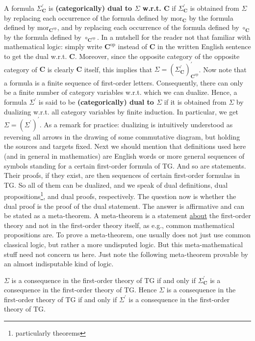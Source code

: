 A formula $\Sigma_{\mathbf{C}}^{\prime}$ is \textbf{(categorically) dual to $\Sigma$ w.r.t. $\mathbf{C}$} if $\Sigma_{\mathbf{C}}^{\prime}$ is obtained from $\Sigma$ by replacing each occurrence of the formula defined by $\mathrm{mor}_{\mathbf{C}}$ by the formula defined by $\mathrm{mor}_{\mathbf{C}^{\mathrm{op}}}$, and by replacing each occurrence of the formula defined by $\circ_{\mathbf{C}}$ by the formula defined by $\circ_{\mathbf{C}^{\mathrm{op}}}$.
In a nutshell for the reader not that familiar with mathematical logic: simply write $\mathbf{C}^{\mathrm{op}}$ instead of $\mathbf{C}$ in the written English sentence to get the dual w.r.t. $\mathbf{C}$.
Moreover, since the opposite category of the opposite category of $\mathbf{C}$ is clearly $\mathbf{C}$ itself, this implies that $\Sigma = (\Sigma_{\mathbf{C}}^{\prime})_{\mathbf{C}^{\mathrm{op}}}^{\prime}$.
Now note that a formula is a finite sequence of first-order letters.
Consequently, there can only be a finite number of category variables w.r.t.
which we can dualize.
Hence, a formula $\Sigma^{\prime}$ is said to be \textbf{(categorically) dual to $\Sigma$} if it is obtained from $\Sigma$ by dualizing w.r.t. all category variables by finite induction.
In particular, we get $\Sigma = (\Sigma^{\prime})^{\prime}$.
As a remark for practice: dualizing is intuitively understood as reversing all arrows in the drawing of some commutative diagram, but holding the sources and targets fixed.
Next we should mention that definitions used here (and in general in mathematics) are English words or more general sequences of symbols standing for a certain first-order formula of TG.
And so are statements.
Their proofs, if they exist, are then sequences of certain first-order formulas in TG.
So all of them can be dualized, and we speak of dual definitions, dual propositions\footnote{particularly theorems}, and dual proofs, respectively.
The question now is whether the dual proof is the proof of the dual statement.
The answer is affirmative and can be stated as a meta-theorem.
A meta-theorem is a statement \underline{about} the first-order theory and not in the first-order theory itself, as e.g., common mathematical propositions are.
To prove a meta-theorem, one usually does not just use common classical logic, but rather a more undisputed logic.
But this meta-mathematical stuff need not concern us here.
Just note the following meta-theorem provable by an almost indisputable kind of logic.
\\
\begin{thm}
\label{thm:dp}
$\Sigma$ is a consequence in the first-order theory of TG if and only if $\Sigma_{\mathbf{C}}^{\prime}$ is a consequence in the first-order theory of TG.
Hence $\Sigma$ is a consequence in the first-order theory of TG if and only if $\Sigma^{\prime}$ is a consequence in the first-order theory of TG.
\end{thm}
